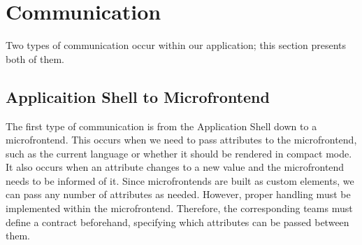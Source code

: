 \section{Communication}
Two types of communication occur within our application; this section presents both of them.

\subsection*{Applicaition Shell to Microfrontend}
The first type of communication is from the Application Shell down to a microfrontend. This occurs when we need to pass attributes to the microfrontend, such as the current language or whether it should be rendered in compact mode. It also occurs when an attribute changes to a new value and the microfrontend needs to be informed of it. Since microfrontends are built as custom elements, we can pass any number of attributes as needed. However, proper handling must be implemented within the microfrontend. Therefore, the corresponding teams must define a contract beforehand, specifying which attributes can be passed between them. 

